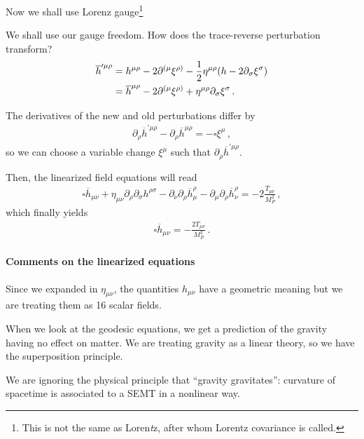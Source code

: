 \documentclass[main.tex]{subfiles}
\begin{document}
Now we shall use Lorenz gauge\footnote{This is not the same as Loren\emph{t}z, after whom Lorentz covariance is called.}

We shall use our gauge freedom. How does the trace-reverse perturbation transform? 
%
\begin{align}
\overline{h}^{\prime  \mu \rho } &=  
h^{\mu \rho } - 2 \partial^{(\mu} \xi^{\rho )} - \frac{1}{2 } \eta^{\mu \rho } \qty(h - 2 \partial_{\sigma } \xi^{\sigma })
\\
&=
\overline{h}^{\mu \rho } - 2 \partial^{(\mu } \xi^{\rho )} + \eta^{\mu \rho } \partial_{\sigma } \xi^{\sigma }
\,.
\end{align}
%

The derivatives of the new and old perturbations differ by 
%
\begin{align}
\partial_{\rho } \overline{h}^{\prime \mu \rho }
- \partial_{\rho } \overline{h}^{\mu \rho } = - \square \xi^{\mu }
\,,
\end{align}
%
so we can choose a variable change \(\xi^{\mu } \) such that \(\partial_{\rho} \overline{h}^{\prime \mu \rho }\).

Then, the linearized field equations will read 
%
\begin{align}
\square \overline{h}_{\mu \nu } 
+ \eta_{\mu \nu } \partial_{\rho }\partial_{\sigma } h^{\rho \sigma } 
-  \partial_{\nu } \partial_{\rho } \overline{h}^{\rho  }_{\mu } - \partial_{\mu } \partial_{\rho } \overline{h}^{\rho }_{\nu } = -2 \frac{T_{\mu \nu }}{M_P^2}
\,,
\end{align}
%
which finally yields 
%
\begin{align}
\square \overline{h}_{\mu \nu } = - \frac{2 T_{\mu \nu }}{M_P^2}
\,.
\end{align}

\paragraph{Comments on the linearized equations}

Since we expanded in \(\eta_{\mu \nu }\), the quantities \(h_{\mu \nu }\) have a geometric meaning but we are treating them as 16 scalar fields. 

When we look at the geodesic equations, we get a prediction of the gravity having no effect on matter. 
We are treating gravity as a linear theory, so we have the superposition principle. 

We are ignoring the physical principle that ``gravity gravitates'': curvature of spacetime is associated to a SEMT in a nonlinear way. 
\end{document}
